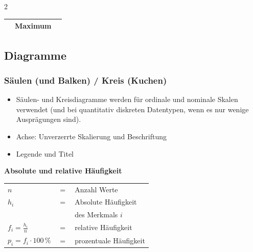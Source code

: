 \begin{multicols}{2}
{\begin{tabular}{|c|l|l|}
 & Maximum & \\\hline
 \end{tabular}
}
%
\headerUndFooterJedeSeite{}

\headerUndFooterJedeSeite{}

\subsection*{Diagramme}
\headerUndFooterJedeSeite{}

\subsubsection*{Säulen (und Balken) / Kreis (Kuchen)}
\headerUndFooterJedeSeite{}


\begin{itemize}
\item Säulen- und Kreisdiagramme werden für ordinale und nominale
  Skalen verwendet (und bei quantitativ diskreten Datentypen, wenn es
  nur wenige Ausprägungen sind).
\item Achse: Unverzerrte Skalierung und Beschriftung
\item Legende und Titel
\end{itemize}

\headerUndFooterJedeSeite{}

\begin{tcolorbox}[colback=white]
  \textbf{Absolute und relative Häufigkeit}\\
\begin{tabular}{lcl}

$n$   &$=$& Anzahl Werte\\
$h_i$ &$=$& Absolute Häufigkeit\\
      & & des Merkmals $i$\\
$f_i = \frac{h_i}n$ &$=$& relative Häufigkeit\\
$p_i = f_i\cdot{}100\,\%$ &$=$& prozentuale Häufigkeit%
  \end{tabular}
\end{tcolorbox}


\end{multicols}
